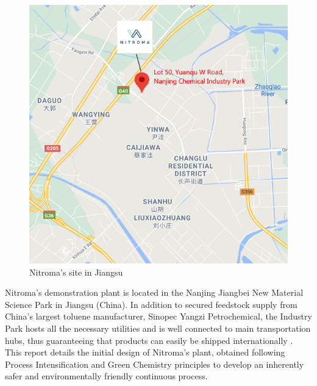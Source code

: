 \begin{figure}
    \centering
    \includegraphics[width=0.2\linewidth]{chapters/0-executive-summary/figures/Location-crop.png}
    \caption{Nitroma's site in Jiangsu}
    \label{fig:location}
\end{figure}
Nitroma's demonstration plant is located in the Nanjing Jiangbei New Material Science Park in Jiangsu (China). In addition to secured feedstock supply from China’s largest toluene manufacturer, Sinopec Yangzi Petrochemical, the Industry Park hosts all the necessary utilities and is well connected to main transportation hubs, thus guaranteeing that products can easily be shipped internationally \cite{sinopec_group_sinopec_2014}. 
This report details the initial design of Nitroma's plant, obtained following Process Intensification and Green Chemistry principles to develop an inherently safer and environmentally friendly continuous process.



